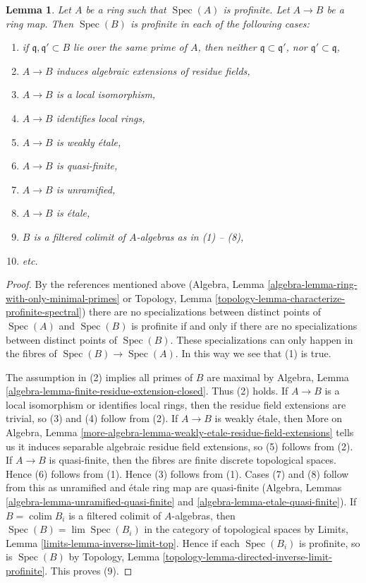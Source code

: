 \documentclass{stacks-project}
\theoremstyle{plain}
\newtheorem{lemma}[subsection]{Lemma}
\theoremstyle{definition}
\theoremstyle{remark}
\numberwithin{equation}{subsection}
\def\lim{\mathop{\mathrm{lim}}\nolimits}
\def\colim{\mathop{\mathrm{colim}}\nolimits}
\def\Spec{\mathop{\mathrm{Spec}}}
\begin{document}
\begin{lemma}
\label{lemma-profinite-goes-up}
Let $A$ be a ring such that $\Spec(A)$ is profinite. Let $A \to B$ be a
ring map. Then $\Spec(B)$ is profinite in each of the following cases:
\begin{enumerate}
\item if $\mathfrak q,\mathfrak q' \subset B$ lie over the same
prime of $A$, then neither $\mathfrak q \subset \mathfrak q'$, nor
$\mathfrak q' \subset \mathfrak q$,
\item $A \to B$ induces algebraic extensions of residue fields,
\item $A \to B$ is a local isomorphism,
\item $A \to B$ identifies local rings,
\item $A \to B$ is weakly \'etale,
\item $A \to B$ is quasi-finite,
\item $A \to B$ is unramified,
\item $A \to B$ is \'etale,
\item $B$ is a filtered colimit of $A$-algebras as in (1) -- (8),
\item etc.
\end{enumerate}
\end{lemma}

\begin{proof}
By the references mentioned above
(Algebra, Lemma \ref{algebra-lemma-ring-with-only-minimal-primes} or
Topology, Lemma \ref{topology-lemma-characterize-profinite-spectral})
there are no specializations between distinct points of $\Spec(A)$ and
$\Spec(B)$ is profinite if and only if there are no specializations
between distinct points of $\Spec(B)$. These specializations can only
happen in the fibres of $\Spec(B) \to \Spec(A)$. In this way we see
that (1) is true.

\medskip\noindent
The assumption in (2) implies all primes of $B$ are maximal by
Algebra, Lemma \ref{algebra-lemma-finite-residue-extension-closed}.
Thus (2) holds.
If $A \to B$ is a local isomorphism or identifies local rings,
then the residue field extensions are trivial, so (3) and (4)
follow from (2).
If $A \to B$ is weakly \'etale, then More on Algebra, Lemma
\ref{more-algebra-lemma-weakly-etale-residue-field-extensions}
tells us it induces separable algebraic residue field extensions, so
(5) follows from (2).
If $A \to B$ is quasi-finite, then the fibres are finite discrete
topological spaces. Hence (6) follows from (1).
Hence (3) follows from (1). Cases (7) and (8)
follow from this as unramified and \'etale ring map are quasi-finite
(Algebra, Lemmas
\ref{algebra-lemma-unramified-quasi-finite} and
\ref{algebra-lemma-etale-quasi-finite}).
If $B = \colim B_i$ is a filtered colimit of $A$-algebras, then
$\Spec(B) = \lim \Spec(B_i)$ in the category of topological spaces by
Limits, Lemma \ref{limits-lemma-inverse-limit-top}.
Hence if each $\Spec(B_i)$ is profinite, so is $\Spec(B)$ by
Topology, Lemma \ref{topology-lemma-directed-inverse-limit-profinite}.
This proves (9).
\end{proof}
\end{document}

